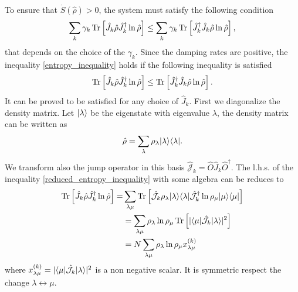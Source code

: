 To ensure that $\dot S(\hat\rho) > 0$, the system must satisfy the following condition
\begin{equation}\label{entropy_inequality}
    \sum_{k}\gamma_{k}\operatorname{Tr}\left[\hat J_{k}\hat\rho\hat J_{k}^\dagger\ln\hat\rho\right] \leq \sum_{k}\gamma_{k} \operatorname{Tr}\left[\hat J_{k}^\dagger\hat J_{k}\hat\rho\ln\hat\rho\right],
\end{equation}
that depends on the choice of the $\gamma_{k}$. 
Since the damping rates are positive, the inequality \eqref{entropy_inequality} holds if the following inequality is satisfied
\begin{equation}\label{reduced_entropy_inequality}
    \operatorname{Tr}\left[\hat J_{k}\hat\rho\hat J_{k}^\dagger\ln\hat\rho\right] \leq \operatorname{Tr}\left[\hat J_{k}^\dagger\hat J_{k}\hat\rho\ln\hat\rho\right].
\end{equation}
It can be proved to be satisfied for any choice of $\hat J_{k}$.
First we diagonalize the density matrix. Let $\lvert\lambda\rangle$ be the eigenstate with eigenvalue $\lambda$, the density matrix can be written as
\begin{equation}
    \hat \rho = \sum_\lambda \rho_\lambda\lvert\lambda\rangle\langle\lambda\rvert.
\end{equation}
We transform also the jump operator in this basis $\hat{\mathcal{J}}_{k}= \hat O \hat J_{k}\hat O^\dagger$.
The l.h.s. of the inequality \eqref{reduced_entropy_inequality} with some algebra can be reduces to 
\begin{equation}
    \begin{split}
        \operatorname{Tr}\left[\hat J_{k} \hat\rho\hat J_{k}^\dagger\ln\hat\rho\right]=& \sum_{\lambda\mu}\operatorname{Tr}\left[\hat{\mathcal{J}}_{k} \rho_\lambda\lvert\lambda\rangle\langle\lambda\rvert\hat{\mathcal{J}}_{k}^\dagger\ln\rho_\mu \lvert\mu\rangle\langle\mu\rvert\right] \\
        &= \sum_{\lambda\mu}\rho_\lambda\ln\rho_\mu\operatorname{Tr}\left[|\langle\mu\rvert\hat{\mathcal{J}}_{k} \lvert\lambda\rangle|^2\right]\\
        &= N \sum_{\lambda\mu}\rho_\lambda\ln\rho_\mu x^{(k)}_{\lambda\mu}
    \end{split}
\end{equation}
where $x^{(k)}_{\lambda\mu} = |\langle\mu\rvert\hat{\mathcal{J}}_{k} \lvert\lambda\rangle|^2$ is a non negative scalar. It is symmetric respect the change $\lambda \leftrightarrow \mu$. 

